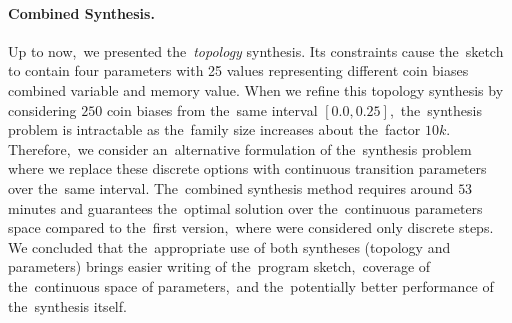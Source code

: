 \paragraph{Combined Synthesis.}
Up to now,~we presented the~\textit{topology} synthesis.
Its constraints cause the~sketch to contain four parameters with 25 values representing different coin biases combined variable and memory value.
When we refine this topology synthesis by considering $250$ coin biases from the~same interval $[0.0, 0.25]$,~the~synthesis problem is intractable as the~family size increases about the~factor $10k$.
Therefore,~we consider an~alternative formulation of the~synthesis problem where we replace these discrete options with continuous transition parameters over the~same interval.
The~combined synthesis method requires around $53$ minutes and guarantees the~optimal solution over the~continuous parameters space compared to the~first version,~where were considered only discrete steps.
We concluded that the~appropriate use of both syntheses (topology and parameters) brings easier writing of the~program sketch,~coverage of the~continuous space of parameters,~and the~potentially better performance of the~synthesis itself.
